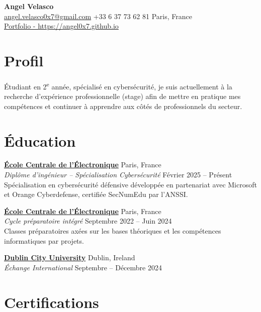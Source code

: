\documentclass[a4paper,10pt]{article}
\newcommand{\linkedtitle}[2]{\href{#1}{\textbf{\color{myblue}#2}}}
\begin{document}
\begin{center}
    {\LARGE \textbf{Angel Velasco}}\\[3pt]
    \small
    \href{mailto:angel.velasco0x7@gmail.com}{angel.velasco0x7@gmail.com} \quad
    +33 6 37 73 62 81 \quad
    Paris, France \\
    {\Large \href{https://angel0x7.github.io}{Portfolio - https://angel0x7.github.io}} 
\end{center}



\section*{Profil}

Étudiant en 2\textsuperscript{e} année, spécialisé en cybersécurité, je suis actuellement à la recherche d'expérience professionnelle (stage) afin de mettre en pratique mes compétences et continuer à apprendre aux côtés de professionnels du secteur. 

\section*{Éducation}

\noindent
\linkedtitle{https://www.ece.fr/en/program/engineering-cycle-bac4-information-systems-and-cybersecurity-major/}{École Centrale de l'Électronique} \hfill Paris, France \\
\emph{Diplôme d'ingénieur – Spécialisation Cybersécurité} \hfill Février 2025 -- Présent \\
Spécialisation en cybersécurité défensive développée en partenariat avec Microsoft et Orange Cyberdefense, certifiée SecNumEdu par l’ANSSI. 


\noindent
\linkedtitle{https://www.ece.fr/}{École Centrale de l'Électronique} \hfill Paris, France \\
\emph{Cycle préparatoire intégré} \hfill Septembre 2022 -- Juin 2024 \\
Classes préparatoires axées sur les bases théoriques et les compétences informatiques par projets. 


\noindent
\linkedtitle{https://www.dcu.ie/}{Dublin City University} \hfill Dublin, Ireland \\
\emph{Échange International} \hfill Septembre -- Décembre 2024 

\section*{Certifications}
\end{document}
